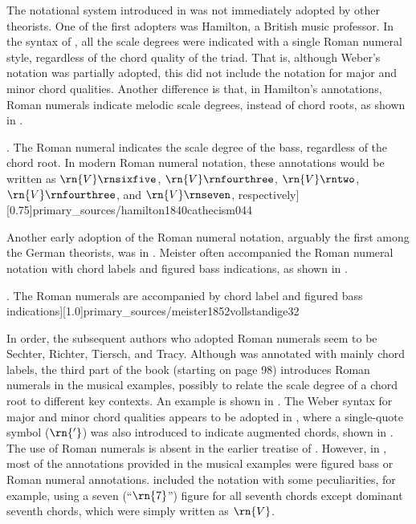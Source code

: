 
The notational system introduced in
\textcite{weber1818versuch} was not immediately adopted by
other theorists. One of the first adopters was Hamilton, a
British music professor. In the syntax of
\textcite{hamilton1840catechism}, all the scale degrees were
indicated with a single Roman numeral style, regardless of
the chord quality of the triad. That is, although Weber's
notation was partially adopted, this did not include the
notation for major and minor chord qualities. Another
difference is that, in Hamilton's annotations, Roman
numerals indicate melodic scale degrees, instead of chord
roots, as shown in
.

\phdfigure[Use of Roman numerals in \textcite[p.
44][0.6]{hamilton1840catechism}. The Roman numeral indicates
the scale degree of the bass, regardless of the chord root.
In modern Roman numeral notation, these annotations would be
written as $\rn{V}\rnsixfive$, $\rn{V}\rnfourthree$,
$\rn{V}\rntwo$, $\rn{V}\rnfourthree$, and $\rn{V}\rnseven$,
respectively][0.75]{primary_sources/hamilton1840cathecism044}

Another early adoption of the Roman numeral notation,
arguably the first among the German theorists, was in
\textcite{meister1852vollstandige}. Meister often
accompanied the Roman numeral notation with chord labels and
figured bass indications, as shown in
.

\phdfigure[Use of Roman numerals in \textcite[p.
32]{meister1852vollstandige}. The Roman numerals are
accompanied by chord label and figured bass
indications][1.0]{primary_sources/meister1852vollstandige32}

In order, the subsequent authors who adopted Roman numerals
seem to be Sechter, Richter, Tiersch, and Tracy. Although
\textcite{sechter1853grundsatze} was annotated with mainly
chord labels, the third part of the book (starting on page
98) introduces Roman numerals in the musical examples,
possibly to relate the scale degree of a chord root to
different key contexts. An example is shown in
. The Weber
syntax for major and minor chord qualities appears to be
adopted in \textcite{richter1860lehrbuch}, where a
single-quote symbol ($\rn{'}$) was also introduced to
indicate augmented chords, shown in
. The use of
Roman numerals is absent in the earlier treatise of
\textcite{tiersch1868system}. However,  in
\textcite{tiersch1874elementarbuch}, most of the annotations
provided in the musical examples were figured bass or Roman
numeral annotations. \textcite{tracy1878theory} included the
notation with some peculiarities, for example, using a seven
(``$\rn{7}$'') figure for all seventh chords except dominant
seventh chords, which were simply written as $\rn{V}$.

